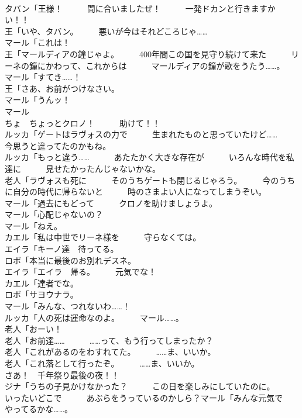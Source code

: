 \documentclass[8pt]{extreport}
\begin{document}
\begin{CJK}{UTF8}{min}
\\	タバン「王様！　　　間に合いましたぜ！　　　一発ドカンと行きますかい！！	
\\	王「いや、タバン。　　　悪いが今はそれどころじゃ……	
\\	マール「これは！	
\\	王「マールディアの鐘じゃよ。　　　400年間この国を見守り続けて来た　　　リーネの鐘にかわって、これからは　　　マールディアの鐘が歌をうたう……。	
\\	マール「すてき……！	
\\	王「さあ、お前がつけなさい。	
\\	マール「うんッ！	
\\	マール
\\	ちょ　ちょっとクロノ！　　　助けて！！	
\\	ルッカ「ゲートはラヴォスの力で　　　生まれたものと思っていたけど……　　　今思うと違ってたのかもね。	
\\	ルッカ「もっと違う……　　　あたたかく大きな存在が　　　いろんな時代を私達に　　　見せたかったんじゃないかな。	
\\	老人「ラヴォスも死に　　　そのうちゲートも閉じるじゃろう。　　　今のうちに自分の時代に帰らないと　　　時のさまよい人になってしまうぞい。	
\\	マール「過去にもどって　　　クロノを助けましょうよ。	
\\	マール「心配じゃないの？	
\\	マール「ねえ。	
\\	カエル「私は中世でリーネ様を　　　守らなくては。	
\\	エイラ「キーノ達　待ってる。	
\\	ロボ「本当に最後のお別れデスネ。	
\\	エイラ「エイラ　帰る。　　　元気でな！	
\\	カエル「達者でな。	
\\	ロボ「サヨウナラ。	
\\	マール「みんな、つれないわ……！	
\\	ルッカ「人の死は運命なのよ。　　　マール……。	
\\	老人「おーい！	
\\	老人「お前達……　　　……って、もう行ってしまったか？	
\\	老人「これがあるのをわすれてた。　　　……ま、いいか。	
\\	老人「これ落として行ったぞ。　　　……ま、いいか。	
\\	さあ！　千年祭り最後の夜！！	
\\	ジナ「うちの子見かけなかった？　　　この日を楽しみにしていたのに。　　　いったいどこで　　　あぶらをうっているのかしら？マール「みんな元気で　　　やってるかな……。	

\end{CJK}
\end{document}
